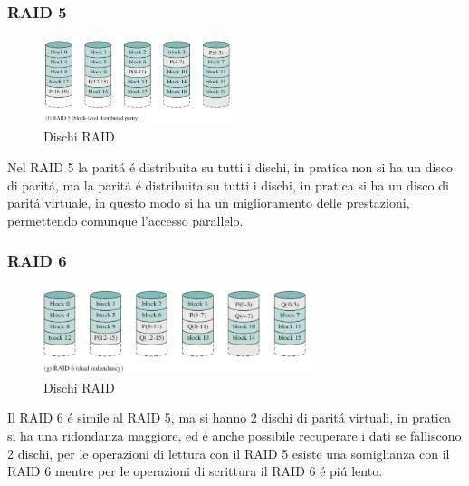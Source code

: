 \subsubsection*{RAID 5}
\begin{figure}[H]
    \centering
    \includegraphics[width=0.5\textwidth]{immagini/RAID5}
    \caption{Dischi RAID}
\end{figure}
Nel RAID 5 la paritá é distribuita su tutti i dischi, in pratica non si ha un disco di paritá, ma la paritá é distribuita
su tutti i dischi, in pratica si ha un disco di paritá virtuale, in questo modo si ha un miglioramento delle prestazioni, permettendo
comunque l'accesso parallelo.
\subsubsection*{RAID 6}
\begin{figure}[H]
    \centering
    \includegraphics[width=0.7\textwidth]{immagini/RAID6}
    \caption{Dischi RAID}
\end{figure}
Il RAID 6 é simile al RAID 5, ma si hanno 2 dischi di paritá virtuali, in pratica si ha una ridondanza maggiore,
ed é anche possibile recuperare i dati se falliscono 2 dischi, per le operazioni di lettura con il
RAID 5 esiste una somiglianza con il RAID 6 mentre per le operazioni di scrittura il RAID 6 é piú lento.
